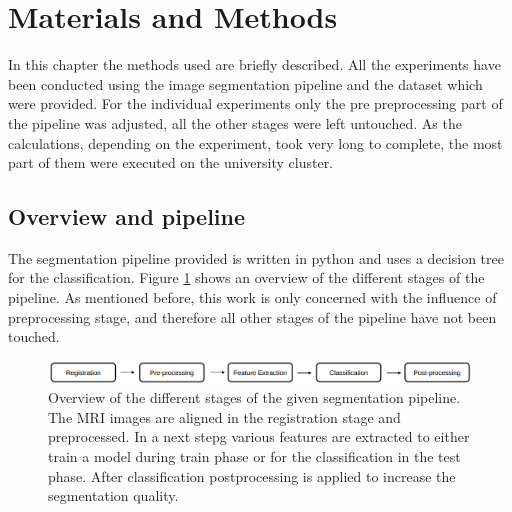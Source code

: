 \documentclass[journal]{IEEEtran}
\begin{document}


\section{Materials and Methods}
In this chapter the methods used are briefly described. All the experiments have been conducted using the image segmentation pipeline and the dataset which were provided. For the individual experiments only the pre preprocessing part of the pipeline was adjusted, all the other stages were left untouched. As the calculations, depending on the experiment, took very long to complete, the most part of them were executed on the university cluster.

\subsection{Overview and pipeline}
The segmentation pipeline provided is written in python and uses a decision tree for the classification. Figure \ref{fig:pipeline} shows an overview of the different stages of the pipeline. As mentioned before, this work is only concerned with the influence of preprocessing stage, and therefore all other stages of the pipeline have not been touched.
\begin{figure}[!t]
\centering
\includegraphics[width=\linewidth]{img/pipeline}
\caption{Overview of the different stages of the given segmentation pipeline. The MRI images are aligned in the registration stage and preprocessed. In a next stepg various features are extracted to either train a model during train phase or for the classification in the test phase. After classification postprocessing is applied to increase the segmentation quality.}
\label{fig:pipeline}
\end{figure}
\end{document}

